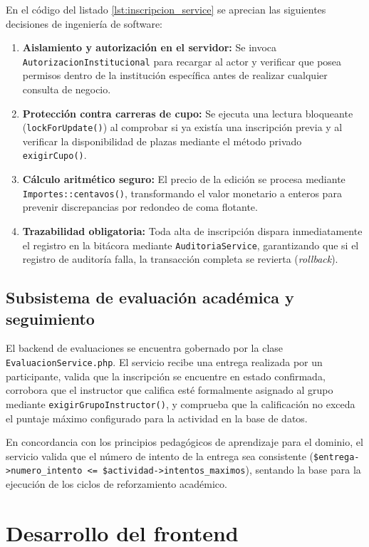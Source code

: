 En el código del listado \ref{lst:inscripcion_service} se aprecian las siguientes decisiones de ingeniería de software:
\begin{enumerate}
    \item \textbf{Aislamiento y autorización en el servidor:} Se invoca \texttt{AutorizacionInstitucional} para recargar al actor y verificar que posea permisos dentro de la institución específica antes de realizar cualquier consulta de negocio.
    \item \textbf{Protección contra carreras de cupo:} Se ejecuta una lectura bloqueante (\texttt{lockForUpdate()}) al comprobar si ya existía una inscripción previa y al verificar la disponibilidad de plazas mediante el método privado \texttt{exigirCupo()}.
    \item \textbf{Cálculo aritmético seguro:} El precio de la edición se procesa mediante \texttt{Importes::centavos()}, transformando el valor monetario a enteros para prevenir discrepancias por redondeo de coma flotante.
    \item \textbf{Trazabilidad obligatoria:} Toda alta de inscripción dispara inmediatamente el registro en la bitácora mediante \texttt{AuditoriaService}, garantizando que si el registro de auditoría falla, la transacción completa se revierta (\textit{rollback}).
\end{enumerate}

\subsection{Subsistema de evaluación académica y seguimiento}
\label{sec:backend_evaluaciones}

El backend de evaluaciones se encuentra gobernado por la clase \texttt{EvaluacionService.php}. El servicio recibe una entrega realizada por un participante, valida que la inscripción se encuentre en estado confirmada, corrobora que el instructor que califica esté formalmente asignado al grupo mediante \texttt{exigirGrupoInstructor()}, y comprueba que la calificación no exceda el puntaje máximo configurado para la actividad en la base de datos.

En concordancia con los principios pedagógicos de aprendizaje para el dominio, el servicio valida que el número de intento de la entrega sea consistente (\texttt{\$entrega->numero\_intento <= \$actividad->intentos\_maximos}), sentando la base para la ejecución de los ciclos de reforzamiento académico.

\section{Desarrollo del frontend}
\label{sec:desarrollo_frontend}

